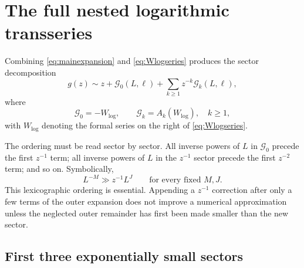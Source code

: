 \documentclass[11pt]{article}
\theoremstyle{clean}
\begin{document}
\section{The full nested logarithmic transseries}

Combining \cref{eq:mainexpansion} and \cref{eq:Wlogseries} produces the
sector decomposition
\begin{equation}\label{eq:fulltransseriesform}
  g(z)\sim z+\mathcal G_0(L,\ell)
  +\sum_{k\ge1}z^{-k}\mathcal G_k(L,\ell),
\end{equation}
where
\begin{equation}\label{eq:Gsectors}
  \mathcal G_0=-W_{\mathrm{log}},
  \qquad
  \mathcal G_k=A_k(W_{\mathrm{log}}),\quad k\ge1,
\end{equation}
with \(W_{\mathrm{log}}\) denoting the formal series on the right of
\cref{eq:Wlogseries}.

The ordering must be read sector by sector.  All inverse powers of \(L\) in
\(\mathcal G_0\) precede the first \(z^{-1}\) term; all inverse powers of
\(L\) in the \(z^{-1}\) sector precede the first \(z^{-2}\) term; and so on.
Symbolically,
\[
  L^{-M}\gg z^{-1}L^J
  \qquad\text{for every fixed }M,J.
\]
This lexicographic ordering is essential.  Appending a \(z^{-1}\) correction
after only a few terms of the outer expansion does not improve a numerical
approximation unless the neglected outer remainder has first been made smaller
than the new sector.

\subsection{First three exponentially small sectors}
\end{document}
